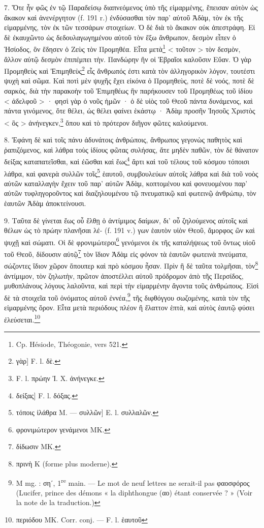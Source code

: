 \documentclass[landscape, a4paper, 11pt, oneside, polutonikogreek, french]{article}
\begin{document}
7. Ὅτε ἦν φῶς ἐν τῷ Παραδείσῳ διαπνεόμενος ὑπὸ τῆς εἱμαρμένης, ἔπεισαν αὐτὸν ὡς ἄκακον καὶ ἀνενέργητον (f. 191 r.) ἐνδύσασθαι τὸν παρ' αὐτοῦ Ἀδὰμ, τὸν ἐκ τῆς εἱμαρμένης, τὸν ἐκ τῶν τεσσάρων στοιχείων. Ὁ δὲ διὰ τὸ ἄκακον οὐκ ἀπεστράφη. Εἰ δὲ ἐκαυχῶντο ὡς δεδουλαγωγημένου αὐτοῦ τὸν ἔξω ἄνθρωπον, δεσμὸν εἶπεν ὁ Ἡσίοδος, ὃν ἔδησεν ὁ Ζεὺς τὸν Προμηθέα. Εἶτα μετὰ\footnote{Cp. Hésiode, Théogonie, vers 521.} < τοῦτον > τὸν δεσμὸν, ἄλλον αὐτῷ δεσμὸν ἐπιπέμπει τὴν. Πανδώρην ἣν οἱ Ἑβραῖοι καλοῦσιν Εὔαν. Ὁ γὰρ Προμηθεὺς καὶ Ἐπιμηθεὺς\footnote{γὰρ] F. l. δὲ.} εἷς ἄνθρωπός ἐστι κατὰ τὸν ἀλληγορικὸν λόγον, τουτέστι ψυχὴ καὶ σῶμα. Καὶ ποτὶ μὲν ψυχῆς ἔχει εἰκόνα ὁ Προμηθεὺς, ποτὲ δὲ νοός, ποτὲ δὲ σαρκὸς, διὰ τὴν παρακοὴν τοῦ Ἐπιμηθέως ἣν παρήκουσεν τοῦ Προμηθέως τοῦ ἰδίου < ἀδελφοῦ > · φησὶ γὰρ ὁ νοῦς ἡμῶν · ὁ δὲ υἱὸς τοῦ Θεοῦ πάντα δυνάμενος, καὶ πάντα γινόμενος, ὅτε θέλει, ὠς θέλει φαίνει ἑκάστῳ · Ἀδὰμ προσῆν Ἰησοῦς Χριστὸς < ὃς > ἀνήνεγκεν,\footnote{F. l. πρώην Ἰ. Χ. ἀνήνεγκε.} ὅπου καὶ τὸ πρότερον διῆγον φῶτες καλούμενοι.

8. Ἐφάνη δὲ καὶ τοῖς πάνυ ἀδυνάτοις ἀνθρώποις, ἄνθρωπος γεγονὼς παθητὸς καὶ ῥαπιζόμενος, καὶ λάθρα τοὺς ἰδίους φῶτας συλήσας, ἅτε μηδὲν παθῶν, τὸν δὲ θάνατον δείξας καταπατεῖσθαι, καὶ ἐῶσθαι καὶ ἕως\footnote{δείξας] F. l. δόξας.} ἄρτι καὶ τοῦ τέλους τοῦ κόσμου τόποισι λάθρα, καὶ φανερὰ συλλῶν τοῖς\footnote{τόποις ἰλάθρα M. --- συλλῶν] E. l. συλλαλῶν.} ἑαυτοῦ, συμβουλεύων αὐτοῖς λάθρα καὶ διὰ τοῦ νοὸς αὐτῶν καταλλαγὴν ἔχειν τοῦ παρ' αὐτῶν Ἀδὰμ, κοπτομένου καὶ φονευομένου παρ' αὐτῶν τυφληγοροῦντος καὶ διαζηλουμένου τῷ πνευματικῷ καὶ φωτεινῷ ἀνθρώπῳ, τὸν ἑαυτῶν Ἀδὰμ ἀποκτείνουσι.

9. Ταῦτα δὲ γίνεται ἕως οὗ ἔλθῃ ὁ ἀντίμιμος δαίμων, δι' οὗ ζηλούμενος αὐτοῖς καὶ θέλων ὡς τὸ πρώην πλανῆσαι λέ- (f. 191 v.) γων ἑαυτὸν υἱὸν Θεοῦ, ἄμορφος ὢν καὶ ψυχῇ καὶ σώματι. Οἱ δὲ φρονιμώτεροι\footnote{φρονιμώτερον γενάμενοι MK.} γενόμενοι ἐκ τῆς καταλήψεως τοῦ ὄντως υἱοῦ τοῦ Θεοῦ, δίδουσιν αὐτῷ\footnote{δίδωσιν MK.} τὸν ἴδιον Ἀδὰμ εἰς φόνον τὰ ἑαυτῶν φωτεινὰ πνεύματα, σώζοντες ἴδιον χῶρον ὅπουπερ καὶ πρὸ κόσμου ἦσαν. Πρὶν ἢ δὲ ταῦτα τολμῆσαι, τὸν\footnote{πρινὴ K (forme plus moderne).} ἀντίμιμον, τὸν ζηλωτὴν, πρῶτον ἀποστέλλει αὑτοῦ πρόδρομον ἀπὸ τῆς Περσίδος, μυθοπλάνους λόγους λαλοῦντα, καὶ περὶ τὴν εἱμαρμένην ἄγοντα τοῦς ἀνθρώπους. Εἰσὶ δὲ τὰ στοιχεῖα τοῦ ὀνόματος αὐτοῦ ἐννέα,\footnote{M mg. : σηʹ, 1\textsuperscript{re} main. --- Le mot de neuf lettres ne serait-il pas φαοσφόρος (Lucifer, prince des démons « la diphthongue (αο) étant conservée ? » (Voir la note de la traduction.)} τῆς διφθόγγου σωζομένης, κατὰ τὸν τῆς εἱμαρμένης ὅρον. Εἶτα μετὰ περιόδους πλέον ἢ ἔλαττον ἑπτὰ, καὶ αὐτὸς ἑαυτῷ φύσει ἐλεύσεται.\footnote{περιόδου MK. Corr. conj. --- F. l. ἑαυτοῦ}
\end{document}
